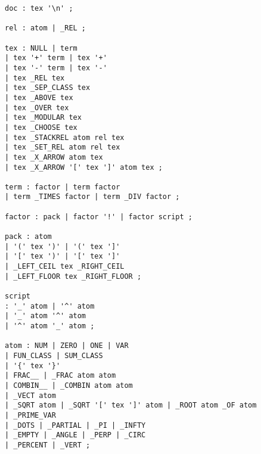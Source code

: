 %
%

\label{grammarRules}

\begin{verbatim}
doc : tex '\n' ;

rel : atom | _REL ;

tex : NULL | term 
| tex '+' term | tex '+' 
| tex '-' term | tex '-' 
| tex _REL tex 
| tex _SEP_CLASS tex 
| tex _ABOVE tex 
| tex _OVER tex 
| tex _MODULAR tex 
| tex _CHOOSE tex  
| tex _STACKREL atom rel tex 
| tex _SET_REL atom rel tex 
| tex _X_ARROW atom tex 
| tex _X_ARROW '[' tex ']' atom tex ;

term : factor | term factor 
| term _TIMES factor | term _DIV factor ;

factor : pack | factor '!' | factor script ;

pack : atom 
| '(' tex ')' | '(' tex ']' 
| '[' tex ')' | '[' tex ']' 
| _LEFT_CEIL tex _RIGHT_CEIL 
| _LEFT_FLOOR tex _RIGHT_FLOOR ;

script
: '_' atom | '^' atom 
| '_' atom '^' atom
| '^' atom '_' atom ;

atom : NUM | ZERO | ONE | VAR 
| FUN_CLASS | SUM_CLASS 
| '{' tex '}' 
| FRAC__ | _FRAC atom atom 
| COMBIN__ | _COMBIN atom atom 
| _VECT atom 
| _SQRT atom | _SQRT '[' tex ']' atom | _ROOT atom _OF atom 
| _PRIME_VAR 
| _DOTS | _PARTIAL | _PI | _INFTY 
| _EMPTY | _ANGLE | _PERP | _CIRC 
| _PERCENT | _VERT ;
\end{verbatim}


